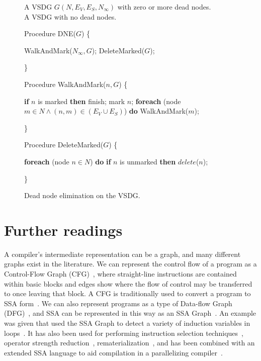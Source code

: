 \begin{figure}[!ht]
\centering
\begin{minipage}[t]{5in}
 A VSDG $G(N,E_V,E_S,N_{\infty})$ with zero or more dead nodes.\\
 A VSDG with no dead nodes.
\setcounter{linectr}{0}

Procedure DNE($G$) \{
\begin{code}
 WalkAndMark($N_{\infty},G$);
 DeleteMarked($G$);
\end{code}
\}

\setcounter{linectr}{0}
Procedure WalkAndMark($n,G$) \{
\begin{code}
 {\bf if} $n$ is marked {\bf then} finish;
 mark $n$;
 {\bf foreach} (node $m \in N \wedge (n,m) \in (E_V \cup E_S)$) {\bf do}
    WalkAndMark($m$);
\end{code}
\}

\setcounter{linectr}{0}
Procedure DeleteMarked($G$) \{
\begin{code}
 {\bf foreach} (node $n \in N$) {\bf do}
    {\bf if} $n$ is unmarked {\bf then} $delete$($n$);
\end{code}
\}

\end{minipage}
\caption{Dead node elimination on the VSDG.}
\label{fig:dnevsdg}
\end{figure}

\section{Further readings}
A compiler's intermediate representation can be a graph, and many different graphs exist in the literature. 
We can represent the control flow of a program as a Control-Flow Graph (CFG)~\cite{808479}, where straight-line instructions are contained within basic blocks and edges show where the flow of control may be transferred to once leaving that block. 
A CFG is traditionally used to convert a program to SSA form~\cite{115320}. 
We can also represent programs as a type of Data-flow Graph (DFG)~\cite{dennis74first,dennis80data}, and SSA can be represented in this way as an SSA Graph~\cite{504710}. 
An example was given that used the SSA Graph to detect a variety of induction variables in loops~\cite{143131,201003}. 
It has also been used for performing instruction selection techniques~\cite{1375663,1269857}, operator strength reduction~\cite{504710}, rematerialization~\cite{143143}, and has been combined with an extended SSA language to aid compilation in a parallelizing compiler~\cite{Stoltz_extendedssa}.

